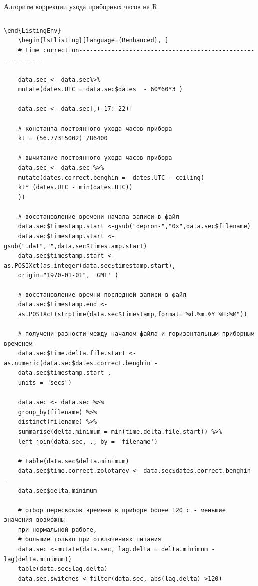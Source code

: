\documentclass[a4paper,14pt]{extreport}
\begin{document}
	
	\begin{ListingEnv}[H]	
		\caption{Алгоритм коррекции ухода 
			приборных часов на R}
		
		\label{list:timecor}
		\begin{lstlisting}[language={Renhanced}, ]
		\end{lstlisting}
	\end{ListingEnv}
	\begin{lstlisting}[language={Renhanced}, ]
	\end{ListingEnv}
	\begin{lstlisting}[language={Renhanced}, ]
	# time correction------------------------------------------------------------
	
	data.sec <- data.sec%>%
	mutate(dates.UTC = data.sec$dates  - 60*60*3 )
	
	data.sec <- data.sec[,(-17:-22)]
	
	# константа постоянного ухода часов прибора
	kt = (56.77315002) /86400
	
	# вычитание постоянного ухода часов прибора
	data.sec <- data.sec %>%
	mutate(dates.correct.benghin =  dates.UTC - ceiling(
	kt* (dates.UTC - min(dates.UTC))
	))
	
	# восстановление времени начала записи в файл
	data.sec$timestamp.start <-gsub("depron-","0x",data.sec$filename)
	data.sec$timestamp.start <-gsub(".dat","",data.sec$timestamp.start)
	data.sec$timestamp.start <- as.POSIXct(as.integer(data.sec$timestamp.start), 
	origin="1970-01-01", 'GMT' )
	
	# восстановление времни последней записи в файл
	data.sec$timestamp.end <- 
	as.POSIXct(strptime(data.sec$timestamp,format="%d.%m.%Y %H:%M"))
	
	# получени разности между началом файла и горизонтальным приборным временем
	data.sec$time.delta.file.start <- as.numeric(data.sec$dates.correct.benghin - 
	data.sec$timestamp.start ,
	units = "secs") 
	
	data.sec <- data.sec %>%
	group_by(filename) %>%
	distinct(filename) %>%
	summarise(delta.minimum = min(time.delta.file.start)) %>%
	left_join(data.sec, ., by = 'filename')
	
	# table(data.sec$delta.minimum)
	data.sec$time.correct.zolotarev <- data.sec$dates.correct.benghin - 
	data.sec$delta.minimum 
	
	# отбор перескоков времени в приборе более 120 с - меньшие значения возможны 
	при нормальной работе, 
	# большие только при отключениях питания
	data.sec <-mutate(data.sec, lag.delta = delta.minimum - lag(delta.minimum))
	table(data.sec$lag.delta)
	data.sec.switches <-filter(data.sec, abs(lag.delta) >120)
	

\end{lstlisting}
\end{document}
